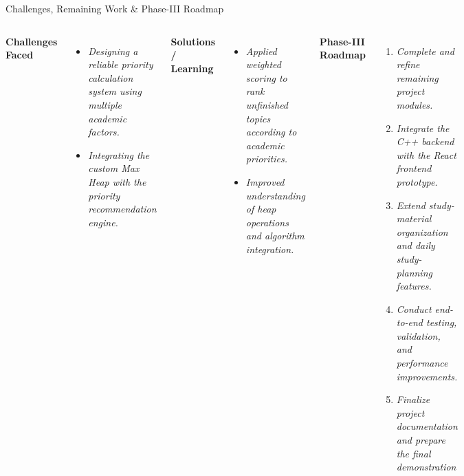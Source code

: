 \documentclass[aspectratio=169,11pt]{beamer}
\newcommand{\placeholder}[1]{%
\textit{\color{GEUGrey}#1}
}
\begin{document}
\begin{frame}{Challenges, Remaining Work \& Phase-III Roadmap}
\vspace{-0.7cm}
\begin{columns}[T,totalwidth=\textwidth]


\textbf{\color{GEUBlue}Challenges Faced}

\begin{itemize}\itemsep2pt
\item \placeholder{Designing a reliable priority calculation system using multiple academic factors.}
\item \placeholder{Integrating the custom Max Heap with the priority recommendation engine.}

\end{itemize}

\vspace{0mm}

\textbf{\color{GEUBlue}Solutions / Learning}

\begin{itemize}\itemsep2pt
\item \placeholder{Applied weighted scoring to rank unfinished topics according to academic priorities.}
\item \placeholder{Improved understanding of heap operations and algorithm integration.}
\end{itemize}


\textbf{\color{GEUBlue}Phase-III Roadmap}

\begin{enumerate}\itemsep3pt
\item \placeholder{Complete and refine remaining project modules.}
\item \placeholder{Integrate the C++ backend with the React frontend prototype.}
\item \placeholder{Extend study-material organization and daily study-planning features.}
\item \placeholder{Conduct end-to-end testing, validation, and performance improvements.}
\item \placeholder{Finalize project documentation and prepare the final demonstration}
\end{enumerate}

\end{columns}

\vfill



\end{frame}
\end{document}

